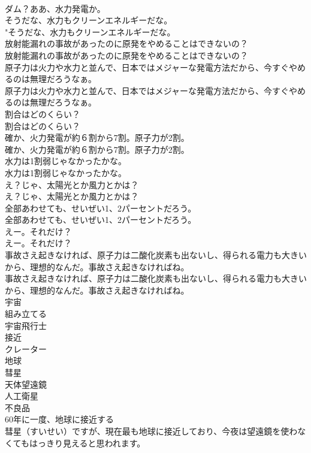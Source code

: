 \documentclass[8pt]{extreport}
\begin{document}
\begin{CJK}{UTF8}{min}
\\	ダム？ああ、水力発電か。 
\\	そうだな、水力もクリーンエネルギーだな。	
\\	"そうだな、水力もクリーンエネルギーだな。 
\\	放射能漏れの事故があったのに原発をやめることはできないの？	
\\	放射能漏れの事故があったのに原発をやめることはできないの？ 
\\	原子力は火力や水力と並んで、日本ではメジャーな発電方法だから、今すぐやめるのは無理だろうなぁ。	
\\	原子力は火力や水力と並んで、日本ではメジャーな発電方法だから、今すぐやめるのは無理だろうなぁ。 
\\	割合はどのくらい？	
\\	割合はどのくらい？ 
\\	確か、火力発電が約６割から7割。原子力が2割。	
\\	確か、火力発電が約６割から7割。原子力が2割。 
\\	水力は1割弱じゃなかったかな。	
\\	水力は1割弱じゃなかったかな。 
\\	え？じゃ、太陽光とか風力とかは？	
\\	え？じゃ、太陽光とか風力とかは？ 
\\	全部あわせても、せいぜい1、2パーセントだろう。	
\\	全部あわせても、せいぜい1、2パーセントだろう。 
\\	えー。それだけ？	
\\	えー。それだけ？ 
\\	事故さえ起きなければ、原子力は二酸化炭素も出ないし、得られる電力も大きいから、理想的なんだ。事故さえ起きなければね。	
\\	事故さえ起きなければ、原子力は二酸化炭素も出ないし、得られる電力も大きいから、理想的なんだ。事故さえ起きなければね。 
\\	宇宙
\\	組み立てる
\\	宇宙飛行士
\\	接近
\\	クレーター
\\	地球
\\	彗星
\\	天体望遠鏡
\\	人工衛星
\\	不良品
\\	60年に一度、地球に接近する
\\	彗星（すいせい）ですが、現在最も地球に接近しており、今夜は望遠鏡を使わなくてもはっきり見えると思われます。	

\end{CJK}
\end{document}
